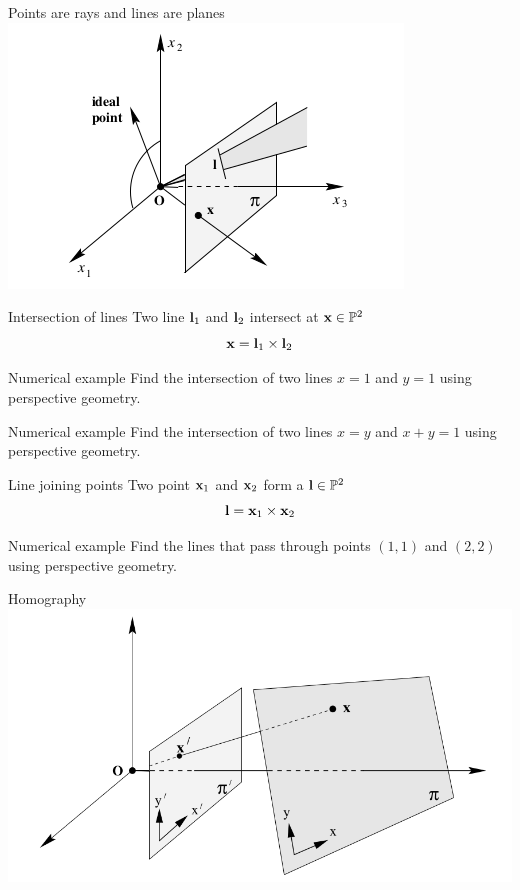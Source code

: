 \documentclass[times,t]{beamer}
\begin{document}
\begin{frame}{Points are rays and  lines are  planes}
  \includegraphics[width=\linewidth]{media/projective-plane-points-are-rays-and-lines-are-planes.png}
\end{frame}

\begin{frame}{Intersection of lines}
  Two line $\mathbf{l}_1$ and $\mathbf{l}_2$ intersect at $\mathbf{x}\in \mathbb{P}^2$
  \[ \mathbf{x} = \mathbf{l}_1 \times \mathbf{l}_2 \]
\end{frame}

\begin{frame}{Numerical example}
  Find   the  intersection  of  two lines $x =  1$  and  $y=1$ using  perspective  geometry.
\end{frame}

\begin{frame}{Numerical example}
  Find   the  intersection  of  two lines $x =  y$  and  $x+y=1$ using  perspective  geometry.
\end{frame}

\begin{frame}{Line joining  points}
  Two point $\mathbf{x}_1$ and $\mathbf{x}_2$ form a $\mathbf{l} \in \mathbb{P}^2$
  \[ \mathbf{l} = \mathbf{x}_1 \times \mathbf{x}_2 \]
\end{frame}

\begin{frame}{Numerical example}
  Find   the  lines that pass through points $(1, 1)$  and  $(2, 2)$ using  perspective  geometry.
\end{frame}

\begin{frame}{Homography}
  \includegraphics[width=\linewidth]{media/homography-maps-a-line-to-a-line.png}
\end{frame}
\end{document}
